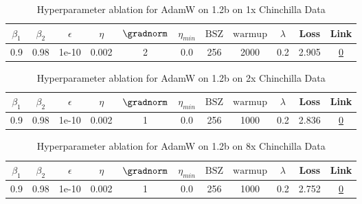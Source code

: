 \begin{table}[H]
\centering
\caption{Hyperparameter ablation for AdamW on 1.2b on 1x Chinchilla Data}
\label{tab:ablation_adamw_1.2b_1}
\begin{tabular}{ccccccccccc}
\toprule
$\beta_1$ & $\beta_2$ & $\epsilon$ & $\eta$ & $\gradnorm$ & $\eta_{min}$ & $\mathrm{BSZ}$ & $\mathrm{warmup}$ & $\lambda$ & Loss & Link \\
\midrule
0.9 & 0.98 & 1e-10 & 0.002 & 2 & 0.0 & 256 & 2000 & 0.2 & 2.905 & \href{https://wandb.ai/stanford-mercury/optimizer-scaling/runs/sweep-1.2b-24B-adamwf115b7lr0.002-wd0.2-minlr0-warmup2000-b10.9--387e9f}{0} \\
\midrule
\bottomrule
\end{tabular}
\end{table}

\begin{table}[H]
\centering
\caption{Hyperparameter ablation for AdamW on 1.2b on 2x Chinchilla Data}
\label{tab:ablation_adamw_1.2b_2}
\begin{tabular}{ccccccccccc}
\toprule
$\beta_1$ & $\beta_2$ & $\epsilon$ & $\eta$ & $\gradnorm$ & $\eta_{min}$ & $\mathrm{BSZ}$ & $\mathrm{warmup}$ & $\lambda$ & Loss & Link \\
\midrule
0.9 & 0.98 & 1e-10 & 0.002 & 1 & 0.0 & 256 & 1000 & 0.2 & 2.836 & \href{https://wandb.ai/stanford-mercury/optimizer-scaling/runs/sweep-1.2b-48B-adamw7ebb9alr0.002-wd0.2-minlr0.0-warmup1000-b10.-994f23}{0} \\
\midrule
\bottomrule
\end{tabular}
\end{table}

\begin{table}[H]
\centering
\caption{Hyperparameter ablation for AdamW on 1.2b on 8x Chinchilla Data}
\label{tab:ablation_adamw_1.2b_8}
\begin{tabular}{ccccccccccc}
\toprule
$\beta_1$ & $\beta_2$ & $\epsilon$ & $\eta$ & $\gradnorm$ & $\eta_{min}$ & $\mathrm{BSZ}$ & $\mathrm{warmup}$ & $\lambda$ & Loss & Link \\
\midrule
0.9 & 0.98 & 1e-10 & 0.002 & 1 & 0.0 & 256 & 1000 & 0.2 & 2.752 & \href{https://wandb.ai/stanford-mercury/optimizer-scaling/runs/sweep-1.2b-193B-adamw1eeba1lr0.002-wd0.2-minlr0.0-warmup1000-b10-44a428}{0} \\
\midrule
\bottomrule
\end{tabular}
\end{table}

